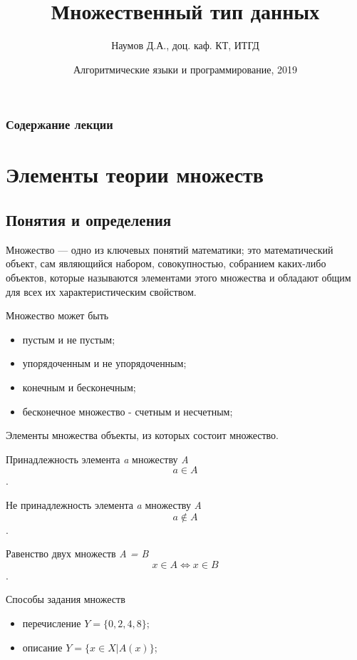 \documentclass{beamer}
\title[Массивы]{Множественный тип данных}
\author{Наумов Д.А., доц. каф. КТ, ИТГД }
\date[16.02.2019] {Алгоритмические языки и программирование, 2019}
\begin{document}
\begin{frame}
  \titlepage
\end{frame}
  
\begin{frame}
  \frametitle{Содержание лекции}
  \tableofcontents  
\end{frame}
  
\section{Элементы теории множеств}
\subsection{Понятия и определения}
\begin{frame}
Множество — одно из ключевых понятий математики; это математический объект, сам являющийся набором, совокупностью, собранием каких-либо объектов, которые называются элементами этого множества и обладают общим для всех их характеристическим свойством.
\begin{block}{Множество может быть}
\begin{itemize}
\item пустым и не пустым;
\item упорядоченным и не упорядоченным;
\item конечным и бесконечным;
\item бесконечное множество - счетным и несчетным;
\end{itemize}
\end{block}
\begin{block}{Элементы множества}
объекты, из которых состоит множество.
\end{block}
\end{frame} 

\begin{frame}
\begin{block}{Принадлежность элемента \textit{a} множеству \textit{A}}
\[a \in A\].
\end{block}
\begin{block}{Не принадлежность элемента \textit{a} множеству \textit{A}}
\[a \notin A\].
\end{block}
\begin{block}{Равенство двух множеств \textit{A = B}}
\[x \in A \Longleftrightarrow x \in B\].
\end{block}
\begin{block}{Способы задания множеств}
\begin{itemize}
\item перечисление $Y = \{0, 2, 4, 8\}$;
\item описание $ Y = \{x \in X | A(x)\} $;
\end{itemize}
\end{block}
\end{frame} 
\end{document}
